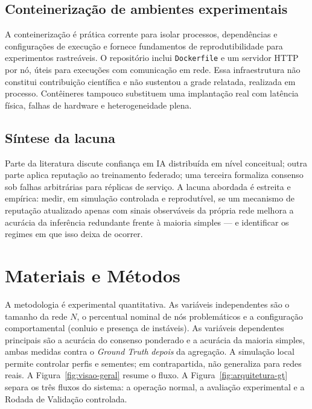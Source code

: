 \documentclass[12pt]{article}
\begin{document}
\subsection{Conteinerização de ambientes experimentais}

A conteinerização \cite{docker2026,burns2022} é prática corrente para isolar processos, dependências e configurações de execução e fornece fundamentos de reprodutibilidade para experimentos rastreáveis. O repositório inclui \texttt{Dockerfile} e um servidor HTTP por nó, úteis para execuções com comunicação em rede. Essa infraestrutura não constitui contribuição científica e não sustentou a grade relatada, realizada em processo. Contêineres tampouco substituem uma implantação real com latência física, falhas de hardware e heterogeneidade plena.

\subsection{Síntese da lacuna}

Parte da literatura discute confiança em IA distribuída em nível conceitual; outra parte aplica reputação ao treinamento federado; uma terceira formaliza consenso sob falhas arbitrárias para réplicas de serviço. A lacuna abordada é estreita e empírica: medir, em simulação controlada e reprodutível, se um mecanismo de reputação atualizado apenas com sinais observáveis da própria rede melhora a acurácia da inferência redundante frente à maioria simples --- e identificar os regimes em que isso deixa de ocorrer.

\section{Materiais e Métodos}
\label{sec:metodos}

A metodologia é experimental quantitativa. As variáveis independentes são o tamanho da rede $N$, o percentual nominal de nós problemáticos e a configuração comportamental (conluio e presença de instáveis). As variáveis dependentes principais são a acurácia do consenso ponderado e a acurácia da maioria simples, ambas medidas contra o \textit{Ground Truth} \emph{depois} da agregação. A simulação local permite controlar perfis e sementes; em contrapartida, não generaliza para redes reais. A Figura~\ref{fig:visao-geral} resume o fluxo. A Figura~\ref{fig:arquitetura-gt} separa os três fluxos do sistema: a operação normal, a avaliação experimental e a Rodada de Validação controlada.
\end{document}
